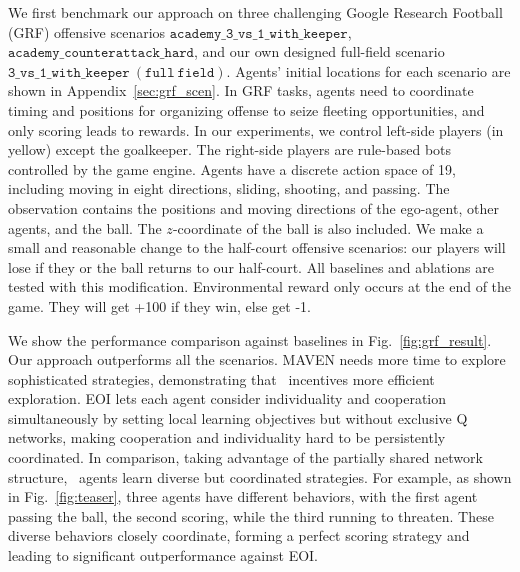 We first benchmark our approach on three challenging Google Research Football (GRF) offensive scenarios $\mathtt{academy\_3\_vs\_1\_with\_keeper}$, $\mathtt{academy\_counterattack\_hard}$, and our own designed full-field scenario $\mathtt{3\_vs\_1\_with\_keeper\ (full\ field)}$. Agents' initial locations for each scenario are shown in Appendix~\ref{sec:grf_scen}. In GRF tasks, agents need to coordinate timing and positions for organizing offense to seize fleeting opportunities, and only scoring leads to rewards. In our experiments, we control left-side players (in yellow) except the goalkeeper. The right-side players are rule-based bots controlled by the game engine. Agents have a discrete action space of 19, including moving in eight directions, sliding, shooting, and passing. The observation contains the positions and moving directions of the ego-agent, other agents, and the ball. The $z$-coordinate of the ball is also included. We make a small and reasonable change to the half-court offensive scenarios: our players will lose if they or the ball returns to our half-court. All baselines and ablations are tested with this modification. Environmental reward only occurs at the end of the game. They will get +100 if they win, else get -1.



We show the performance comparison against baselines in Fig.~\ref{fig:grf_result}. Our approach outperforms all the scenarios. MAVEN needs more time to explore sophisticated strategies, demonstrating that \name~incentives more efficient exploration. EOI lets each agent consider individuality and cooperation simultaneously by setting local learning objectives but without exclusive Q networks, making cooperation and individuality hard to be persistently coordinated. In comparison, taking advantage of the partially shared network structure, \name~agents learn diverse but coordinated strategies. For example, as shown in Fig.~\ref{fig:teaser}, three agents have different behaviors, with the first agent passing the ball, the second scoring, while the third running to threaten. These diverse behaviors closely coordinate, forming a perfect scoring strategy and leading to significant outperformance against EOI. 



